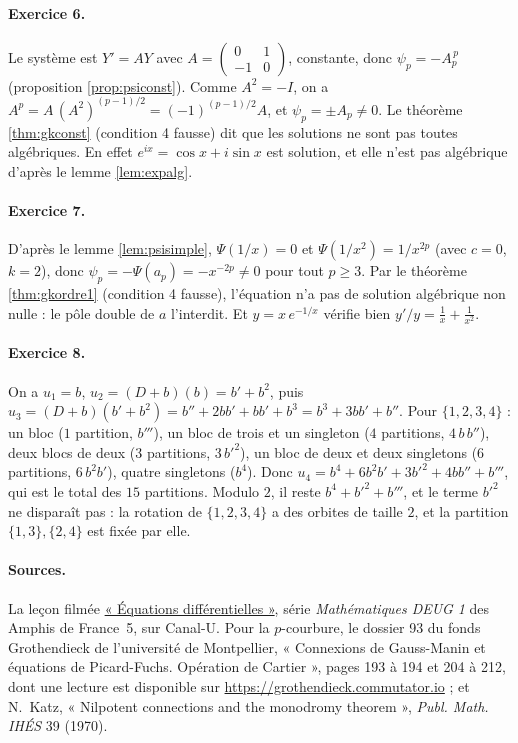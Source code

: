 \documentclass[11pt,a4paper]{article}
\theoremstyle{plain}
\theoremstyle{definition}
\theoremstyle{remark}
\newcommand{\Dx}{D}
\begin{document}
\paragraph{Exercice 6.} Le système est $Y' = AY$ avec $A = \begin{pmatrix} 0 & 1 \\ -1 & 0 \end{pmatrix}$, constante, donc $\psi_p = -A_p^{\,p}$ (proposition \ref{prop:psiconst}). Comme $A^2 = -I$, on a $A^p = A\,(A^2)^{(p-1)/2} = (-1)^{(p-1)/2} A$, et $\psi_p = \pm A_p \neq 0$. Le théorème \ref{thm:gkconst} (condition 4 fausse) dit que les solutions ne sont pas toutes algébriques. En effet $e^{ix} = \cos x + i \sin x$ est solution, et elle n'est pas algébrique d'après le lemme \ref{lem:expalg}.

\paragraph{Exercice 7.} D'après le lemme \ref{lem:psisimple}, $\Psi(1/x) = 0$ et $\Psi(1/x^2) = 1/x^{2p}$ (avec $c = 0$, $k = 2$), donc $\psi_p = -\Psi(a_p) = -x^{-2p} \neq 0$ pour tout $p \geq 3$. Par le théorème \ref{thm:gkordre1} (condition 4 fausse), l'équation n'a pas de solution algébrique non nulle : le pôle double de $a$ l'interdit. Et $y = x\,e^{-1/x}$ vérifie bien $y'/y = \frac1x + \frac1{x^2}$.

\paragraph{Exercice 8.} On a $u_1 = b$, $u_2 = (\Dx + b)(b) = b' + b^2$, puis $u_3 = (\Dx+b)(b' + b^2) = b'' + 2bb' + bb' + b^3 = b^3 + 3bb' + b''$. Pour $\{1,2,3,4\}$ : un bloc ($1$ partition, $b'''$), un bloc de trois et un singleton ($4$ partitions, $4\,b\,b''$), deux blocs de deux ($3$ partitions, $3\,b'^2$), un bloc de deux et deux singletons ($6$ partitions, $6\,b^2 b'$), quatre singletons ($b^4$). Donc $u_4 = b^4 + 6b^2b' + 3b'^2 + 4bb'' + b'''$, qui est le total des $15$ partitions. Modulo $2$, il reste $b^4 + b'^2 + b'''$, et le terme $b'^2$ ne disparaît pas : la rotation de $\{1,2,3,4\}$ a des orbites de taille $2$, et la partition $\{1,3\},\{2,4\}$ est fixée par elle.

\paragraph{Sources.} La leçon filmée \href{https://www.canal-u.tv/chaines/les-amphis-de-france-5/mathematiques-deug-1/equations-differentielles}{« Équations différentielles »}, série \emph{Mathématiques DEUG 1} des Amphis de France~5, sur Canal-U. Pour la $p$-courbure, le dossier 93 du fonds Grothendieck de l'université de Montpellier, « Connexions de Gauss-Manin et équations de Picard-Fuchs. Opération de Cartier », pages 193 à 194 et 204 à 212, dont une lecture est disponible sur \url{https://grothendieck.commutator.io} ; et N.~Katz, « Nilpotent connections and the monodromy theorem », \emph{Publ. Math. IHÉS} 39 (1970).
\end{document}
